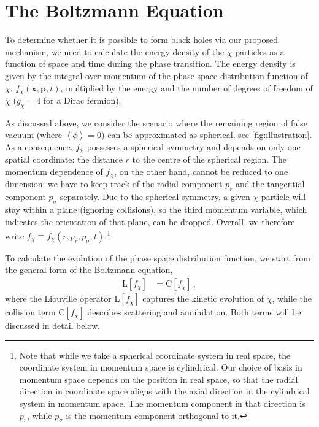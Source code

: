 \documentclass[
onecolumn, %
11pt, %
tightenlines,
superscriptaddress, %
nofootinbib, %
preprintnumbers, %
prd %
]{revtex4-1}
\newcommand{\ev}[1]{\ensuremath{\left\langle #1 %
        \right\rangle}} %
\renewcommand{\vec}[1]{{\boldsymbol{#1}}}
\newcommand{\f}{\ensuremath{f_\chi}\xspace}
\begin{document}
\section{The Boltzmann Equation}
\label{sec:boltzmann}

To determine whether it is possible to form black holes via our proposed mechanism, we need to calculate the energy density of the $\chi$ particles as a function of space and time during the phase transition.  The energy density is given by the integral over momentum of the phase space distribution function of $\chi$, $\f(\vec{x}, \vec{p}, t)$, multiplied by the energy and the number of degrees of freedom of $\chi$ ($g_\chi=4$ for a Dirac fermion). 

As discussed above, we consider the scenario where the remaining region of false vacuum (where $\ev{\phi} = 0$) can be approximated as spherical, see \cref{fig:illustration}. As a consequence, \f possesses a spherical symmetry and depends on only one spatial coordinate: the distance $r$ to the centre of the spherical region. The momentum dependence of $\f$, on the other hand, cannot be reduced to one dimension: we have to keep track of the radial component $p_r$ and the tangential component $p_\sigma$ separately. Due to the spherical symmetry, a given $\chi$ particle will stay within a plane (ignoring collisions), so the third momentum variable, which indicates the orientation of that plane, can be dropped.  Overall, we therefore write $\f \equiv \f(r, p_r, p_\sigma, t)$.\footnote{Note that while we take a spherical coordinate system in real space, the coordinate system in momentum space is cylindrical.  Our choice of basis in momentum space depends on the position in real space, so that the radial direction in coordinate space aligns with the axial direction in the cylindrical system in momentum space. The momentum component in that direction is $p_r$, while $p_\sigma$ is the momentum component orthogonal to it.}

To calculate the evolution of the phase space distribution function, we start from the general form of the Boltzmann equation,
%
\begin{align}
    \label{eq:boltzmann}
    \boldsymbol{\mathrm L}[\f] &= \boldsymbol{\mathrm C}[\f] \,,
\end{align}
%
where the Liouville operator $\boldsymbol{\mathrm L}[\f]$ captures the kinetic evolution of $\chi$, while the collision term $\boldsymbol{\mathrm C}[\f]$ describes scattering and annihilation.
Both terms will be discussed in detail below.
\end{document}
